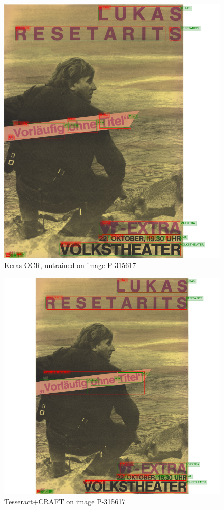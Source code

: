 \begin{figure}[hbtp!]
    \centering
   \includegraphics[scale=0.3]{obrazky/plakaty/result_kerasOCR_vienna2_nosplit-83.png}
    \caption{Keras-OCR, untrained  on image P-315617}
    \label{Im3:ex:keras}
\end{figure}

\begin{figure}[hbtp!]
    \centering
    \includegraphics[scale=0.3]{obrazky/plakaty/result_carfttesseract_vienna2_split_special_snesitive-83.png}
    \caption{Tesseract+CRAFT  on image P-315617}
    \label{Im3:ex:craft}
\end{figure}

